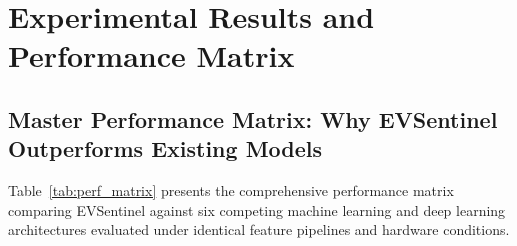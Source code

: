 \documentclass[conference]{IEEEtran}
\begin{document}
\section{Experimental Results and Performance Matrix}

\subsection{Master Performance Matrix: Why EVSentinel Outperforms Existing Models}
Table~\ref{tab:perf_matrix} presents the comprehensive performance matrix comparing EVSentinel against six competing machine learning and deep learning architectures evaluated under identical feature pipelines and hardware conditions.
\end{document}
